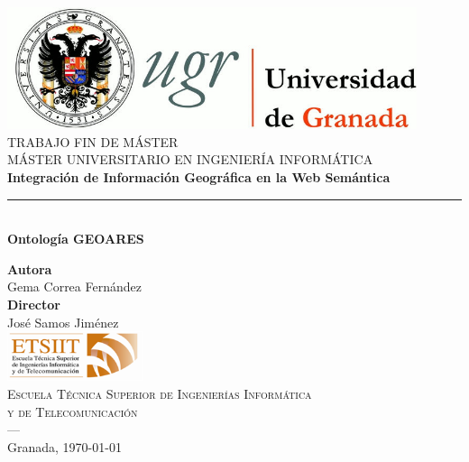 \begin{titlepage}
 
 
\newlength{\centeroffset}
\setlength{\centeroffset}{-0.5\oddsidemargin}
\addtolength{\centeroffset}{0.5\evensidemargin}
\thispagestyle{empty}

\noindent\hspace*{\centeroffset}\begin{minipage}{\textwidth}

\centering
\includegraphics[width=0.9\textwidth]{imagenes/logo_ugr.jpg}\\[1.4cm]

\textsc{ \Large TRABAJO FIN DE MÁSTER\\[0.2cm]}
\textsc{ MÁSTER UNIVERSITARIO EN INGENIERÍA INFORMÁTICA}\\[1cm]
% 
{\huge\bfseries Integración de Información Geográfica en la Web Semántica\\
}
\noindent\rule[-1ex]{\textwidth}{3pt}\\[3.5ex]
{\Large\bfseries Ontología GEOARES}
\end{minipage}

\vspace{2cm}
\noindent\hspace*{\centeroffset}\begin{minipage}{\textwidth}
\centering

\textbf{Autora}\\ {Gema Correa Fernández}\\[2.5ex]
\textbf{Director}\\
{José Samos Jiménez}\\[2cm]
\includegraphics[width=0.3\textwidth]{imagenes/etsiit_logo.png}\\[0.1cm]
\textsc{Escuela Técnica Superior de Ingenierías Informática \\y de Telecomunicación}\\
\textsc{---}\\
Granada, \today
\end{minipage}
\end{titlepage}


